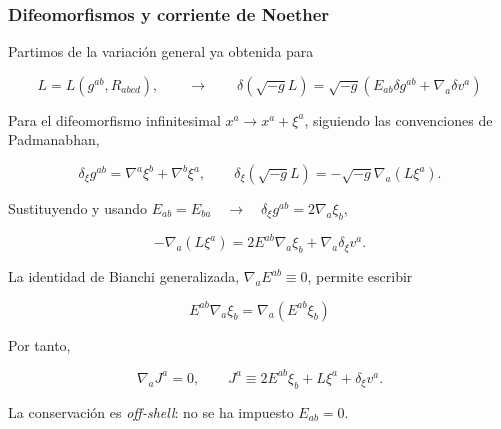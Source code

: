 \documentclass{beamer}
\newcommand{\CompactDisplaySpacing}{%
  \setlength{\abovedisplayskip}{2pt plus 1pt minus 1pt}%
  \setlength{\belowdisplayskip}{2pt plus 1pt minus 1pt}%
  \setlength{\abovedisplayshortskip}{0pt plus 1pt}%
  \setlength{\belowdisplayshortskip}{1pt plus 1pt}%
}
\begin{document}
\begin{frame}[label=nav-frame-042]
	\frametitle{Difeomorfismos y corriente de Noether}
\linespread{.96}\selectfont\CompactDisplaySpacing
	\small

	Partimos de la variación general ya obtenida para

	\[
	L=L(g^{ab},R_{abcd}),
	\qquad \longrightarrow \qquad
	\delta(\sqrt{-g}L)
	=
	\sqrt{-g}
	\left(
	E_{ab}\delta g^{ab}
	+
	\nabla_a\delta v^a
	\right)
	\]

	Para el difeomorfismo infinitesimal
	\(x^a\rightarrow x^a+\xi^a\), siguiendo las
	convenciones de Padmanabhan,

	\[
	\delta_\xi g^{ab}
	=
	\nabla^a\xi^b+\nabla^b\xi^a,
	\qquad
	\delta_\xi(\sqrt{-g}L)
	=
	-\sqrt{-g}\nabla_a(L\xi^a).
	\]

	Sustituyendo y usando \(E_{ab}=E_{ba} \quad\rightarrow\quad \delta_\xi g^{ab} = 2\nabla_a\xi_b\),

	\[
	-\nabla_a(L\xi^a)
	=
	2E^{ab}\nabla_a\xi_b
	+
	\nabla_a\delta_\xi v^a.
	\]

	La identidad de Bianchi generalizada, $\nabla_aE^{ab}\equiv0$, permite escribir

	\[
	E^{ab}\nabla_a\xi_b
	=
	\nabla_a(E^{ab}\xi_b)
	\]

	Por tanto,

	\begin{equation}
		\boxed{
			\nabla_aJ^a=0,
			\qquad
			J^a
			\equiv
			2E^{ab}\xi_b
			+
			L\xi^a
			+
			\delta_\xi v^a.
		}
		\label{eq:noether-current-pad}
	\end{equation}

	La conservación es \emph{off-shell}: no se ha impuesto
	\(E_{ab}=0\).

\end{frame}
\end{document}
